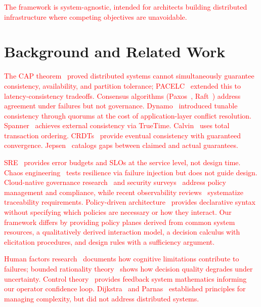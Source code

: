 \documentclass[conference]{IEEEtran}
\begin{document}
\textcolor{red}{The framework is system-agnostic, intended for architects building distributed infrastructure where competing objectives are unavoidable.}

\section{Background and Related Work}

\textcolor{red}{The CAP theorem~\cite{brewer2000cap,gilbert2002brewer} proved distributed systems cannot simultaneously guarantee consistency, availability, and partition tolerance; PACELC~\cite{pacelc} extended this to latency-consistency tradeoffs. Consensus algorithms (Paxos~\cite{lamport2001paxos}, Raft~\cite{raft}) address agreement under failures but not governance. Dynamo~\cite{dynamo} introduced tunable consistency through quorums at the cost of application-layer conflict resolution. Spanner~\cite{spanner} achieves external consistency via TrueTime. Calvin~\cite{calvin} uses total transaction ordering. CRDTs~\cite{crdt} provide eventual consistency with guaranteed convergence. Jepsen~\cite{jepsen} catalogs gaps between claimed and actual guarantees.}

\textcolor{red}{SRE~\cite{sre} provides error budgets and SLOs at the service level, not design time. Chaos engineering~\cite{chaos} tests resilience via failure injection but does not guide design. Cloud-native governance research~\cite{pourmajidi2025governance,cncf2023policy,cncf2023governance} and security surveys~\cite{theodoropoulos2023cloud} address policy management and compliance, while recent observability reviews~\cite{observability2026} systematize traceability requirements. Policy-driven architecture~\cite{policyarch} provides declarative syntax without specifying which policies are necessary or how they interact. Our framework differs by providing policy planes derived from common system resources, a qualitatively derived interaction model, a decision calculus with elicitation procedures, and design rules with a sufficiency argument.}

\textcolor{red}{Human factors research~\cite{humanfactors,leveson} documents how cognitive limitations contribute to failures; bounded rationality theory~\cite{simon} shows how decision quality degrades under uncertainty. Control theory~\cite{controltheory} provides feedback system mathematics informing our operator confidence loop. Dijkstra~\cite{dijkstra1972humble} and Parnas~\cite{parnas1972criteria} established principles for managing complexity, but did not address distributed systems.}
\end{document}
